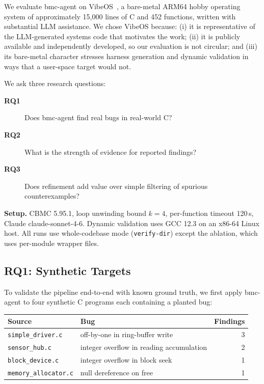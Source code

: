 \documentclass[11pt,a4paper]{article}
\newcommand{\tool}{bmc-agent\xspace}
\newcommand{\vibeos}{VibeOS\xspace}
\begin{document}
We evaluate \tool on \vibeos~\cite{vibeos}, a bare-metal ARM64 hobby
operating system of approximately 15{,}000 lines of C and 452 functions,
written with substantial LLM assistance. We chose \vibeos because: (i) it is representative of the
LLM-generated systems code that motivates the work; (ii) it is publicly
available and independently developed, so our evaluation is not circular;
and (iii) its bare-metal character stresses harness generation and
dynamic validation in ways that a user-space target would not.

We ask three research questions:

\begin{description}
\item[\textbf{RQ1}] Does \tool find real bugs in real-world C?
\item[\textbf{RQ2}] What is the strength of evidence for reported findings?
\item[\textbf{RQ3}] Does refinement add value over simple filtering of
  spurious counterexamples?
\end{description}

\noindent\textbf{Setup.} CBMC 5.95.1, loop unwinding bound $k=4$, per-function
timeout 120\,s, Claude claude-sonnet-4-6. Dynamic validation uses GCC 12.3 on
an x86-64 Linux host. All runs use whole-codebase mode (\verb|verify-dir|)
except the ablation, which uses per-module wrapper files.

\subsection{RQ1: Synthetic Targets}

To validate the pipeline end-to-end with known ground truth, we first apply
\tool to four synthetic C programs each containing a planted bug:

\begin{center}
\small
\begin{tabular}{llr}
\toprule
Source & Bug & Findings \\
\midrule
\texttt{simple\_driver.c} & off-by-one in ring-buffer write & 3 \\
\texttt{sensor\_hub.c}    & integer overflow in reading accumulation & 2 \\
\texttt{block\_device.c}  & integer overflow in block seek & 1 \\
\texttt{memory\_allocator.c} & null dereference on free & 1 \\
\bottomrule
\end{tabular}
\end{center}
\end{document}
